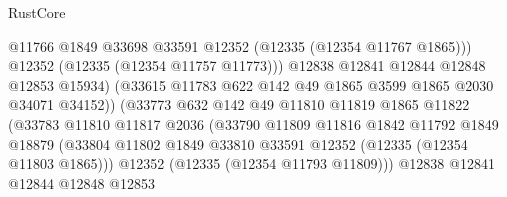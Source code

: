 \begin{lexlean}{RustCore}
\begin{coremodule}
                                        @11766
                                        @1849
                                        @33698
                                        @33591
                                        @12352
                                        (@12335 (@12354 @11767 @1865)))
                                      @12352
                                      (@12335 (@12354 @11757 @11773)))
                                    @12838
                                    @12841
                                    @12844
                                    @12848
                                    @12853
                                    @15934)
                                  (@33615
                                    @11783
                                    @622
                                    @142
                                    @49
                                    @1865
                                    @3599
                                    @1865
                                    @2030
                                    @34071
                                    @34152))
                                (@33773
                                  @632
                                  @142
                                  @49
                                  @11810
                                  @11819
                                  @1865
                                  @11822
                                  (@33783
                                    @11810
                                    @11817
                                    @2036
                                    (@33790
                                      @11809
                                      @11816
                                      @1842
                                      @11792
                                      @1849
                                      @18879
                                      (@33804
                                        @11802
                                        @1849
                                        @33810
                                        @33591
                                        @12352
                                        (@12335 (@12354 @11803 @1865)))
                                      @12352
                                      (@12335 (@12354 @11793 @11809)))
                                    @12838
                                    @12841
                                    @12844
                                    @12848
                                    @12853

\end{coremodule}
\end{lexlean}
